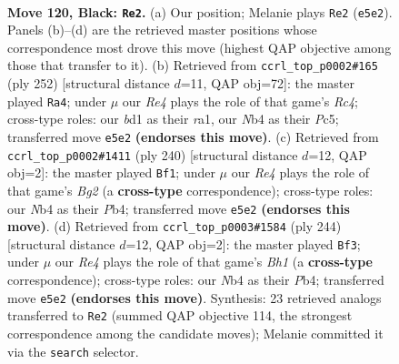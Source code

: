 \documentclass[11pt]{article}
\begin{document}
\clearpage

\begin{figure}[p]\centering
\begin{subfigure}{0.46\textwidth}\centering
\resizebox{\linewidth}{!}{%
\newchessgame
\chessboard[
  setfen={8/8/8/4r1pk/1n6/6K1/8/3B4 b - - 25 120},
  showmover=false,
  pgfstyle=straightmove, color=movearrow, markmove={e5-e2}
]}
\caption{}
\end{subfigure}\hfill
\begin{subfigure}{0.46\textwidth}\centering
\resizebox{\linewidth}{!}{%
\newchessgame
\chessboard[
  setfen={8/8/P1k5/K1P5/2R5/8/8/r7 w - - 3 127},
  showmover=false,
  pgfstyle=straightmove, color=movearrow, markmove={c4-a4}
]}
\caption{}
\end{subfigure}
\\[4pt]
\begin{subfigure}{0.46\textwidth}\centering
\resizebox{\linewidth}{!}{%
\newchessgame
\chessboard[
  setfen={8/4b3/1k6/8/1PP5/1K6/6B1/8 w - - 81 121},
  showmover=false,
  pgfstyle=straightmove, color=movearrow, markmove={g2-f1}
]}
\caption{}
\end{subfigure}\hfill
\begin{subfigure}{0.46\textwidth}\centering
\resizebox{\linewidth}{!}{%
\newchessgame
\chessboard[
  setfen={8/4b3/1k6/8/1PP5/1K6/8/7B w - - 65 123},
  showmover=false,
  pgfstyle=straightmove, color=movearrow, markmove={h1-f3}
]}
\caption{}
\end{subfigure}
\caption{\textbf{Move 120, Black: \texttt{Re2}.} (a) Our position; Melanie plays \texttt{Re2} (\texttt{e5e2}). Panels (b)--(d) are the retrieved master positions whose correspondence most drove this move (highest QAP objective among those that transfer to it). (b) Retrieved from \texttt{ccrl\_top\_p0002\#165} (ply 252) [structural distance $d$=11, QAP obj=72]: the master played \texttt{Ra4}; under $\mu$ our \emph{Re4} plays the role of that game's \emph{Rc4}; cross-type roles: our \emph{b}d1 as their \emph{r}a1, our \emph{N}b4 as their \emph{P}c5; transferred move \texttt{e5e2} \textbf{(endorses this move)}. (c) Retrieved from \texttt{ccrl\_top\_p0002\#1411} (ply 240) [structural distance $d$=12, QAP obj=2]: the master played \texttt{Bf1}; under $\mu$ our \emph{Re4} plays the role of that game's \emph{Bg2} (a \textbf{cross-type} correspondence); cross-type roles: our \emph{N}b4 as their \emph{P}b4; transferred move \texttt{e5e2} \textbf{(endorses this move)}. (d) Retrieved from \texttt{ccrl\_top\_p0003\#1584} (ply 244) [structural distance $d$=12, QAP obj=2]: the master played \texttt{Bf3}; under $\mu$ our \emph{Re4} plays the role of that game's \emph{Bh1} (a \textbf{cross-type} correspondence); cross-type roles: our \emph{N}b4 as their \emph{P}b4; transferred move \texttt{e5e2} \textbf{(endorses this move)}. Synthesis: 23 retrieved analogs transferred to \texttt{Re2} (summed QAP objective 114, the strongest correspondence among the candidate moves); Melanie committed it via the \texttt{search} selector.}
\label{fig:thought-m239}
\end{figure}
\end{document}
